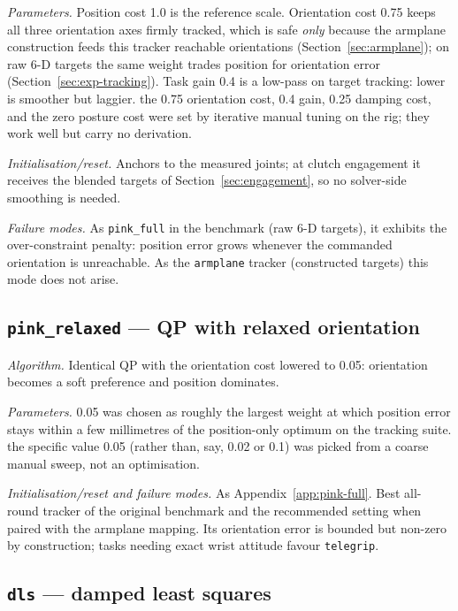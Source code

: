 \emph{Parameters.} Position cost 1.0 is the reference scale. Orientation
cost 0.75 keeps all three orientation axes firmly tracked, which is safe
\emph{only} because the armplane construction feeds this tracker
reachable orientations (Section~\ref{sec:armplane}); on raw 6-D targets
the same weight trades position for orientation error
(Section~\ref{sec:exp-tracking}). Task gain 0.4 is a low-pass on target
tracking: lower is smoother but laggier.
\unjustified{} the 0.75 orientation cost, 0.4 gain, 0.25
damping cost, and the zero posture cost were set by iterative manual
tuning on the rig; they work well but carry no derivation.

\emph{Initialisation/reset.} Anchors to the measured joints; at clutch
engagement it receives the blended targets of
Section~\ref{sec:engagement}, so no solver-side smoothing is needed.

\emph{Failure modes.} As \texttt{pink\_full} in the benchmark (raw 6-D
targets), it exhibits the over-constraint penalty: position error grows
whenever the commanded orientation is unreachable. As the
\texttt{armplane} tracker (constructed targets) this mode does not
arise.

\subsection{\texttt{pink\_relaxed} — QP with relaxed orientation}
\label{app:pink-relaxed}

\emph{Algorithm.} Identical QP with the orientation cost lowered to
0.05: orientation becomes a soft preference and position dominates.

\emph{Parameters.} 0.05 was chosen as roughly the largest weight at
which position error stays within a few millimetres of the
position-only optimum on the tracking suite.
\unjustified{} the specific value 0.05 (rather than, say,
0.02 or 0.1) was picked from a coarse manual sweep, not an optimisation.

\emph{Initialisation/reset and failure modes.} As
Appendix~\ref{app:pink-full}. Best all-round tracker of the original
benchmark and the recommended setting when paired with the armplane
mapping. Its orientation error is bounded but non-zero by construction;
tasks needing exact wrist attitude favour \texttt{telegrip}.

\subsection{\texttt{dls} — damped least squares}
\label{app:dls}

